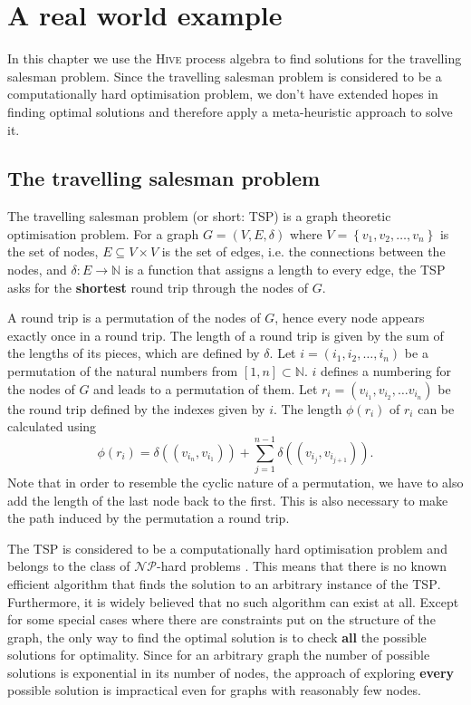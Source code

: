 \chapter{A real world example}
In this chapter we use the \textsc{Hive} process algebra to find solutions for the travelling salesman problem. Since the travelling salesman problem is considered to be a computationally hard optimisation problem, we don't have extended hopes in finding optimal solutions and therefore apply a meta-heuristic approach to solve it.

\section{The travelling salesman problem}
The travelling salesman problem (or short: \textsc{TSP}) is a graph theoretic optimisation problem. For a graph $G = \left( V, E, \delta \right)$ where $V = \left\{ v_1, v_2, \ldots, v_n \right\}$ is the set of nodes, $E \subseteq V \times V$ is the set of edges, i.e. the connections between the nodes, and $\delta \colon E \to \mathbb{N}$ is a function that assigns a length to every edge, the \textsc{TSP} asks for the \textbf{shortest} round trip through the nodes of $G$.

A round trip is a permutation of the nodes of $G$, hence every node appears exactly once in a round trip. The length of a round trip is given by the sum of the lengths of its pieces, which are defined by $\delta$. Let $i = \left( i_1, i_2, \ldots, i_n \right)$ be a permutation of the natural numbers from $[1, n] \subset \mathbb{N}$. $i$ defines a numbering for the nodes of $G$ and leads to a permutation of them. Let $r_i = \left( v_{i_1}, v_{i_2}, \ldots v_{i_n} \right)$ be the round trip defined by the indexes given by $i$. The length $\phi \left( r_i \right)$ of $r_i$ can be calculated using
\begin{equation}
  \label{eqn:length_roundtrip}
  \phi \left( r_i \right) = \delta \left( \left( v_{i_n}, v_{i_1} \right) \right) + \sum_{j=1}^{n-1} \delta \left( \left( v_{i_j}, v_{i_{j+1}} \right) \right).
\end{equation}
Note that in order to resemble the cyclic nature of a permutation, we have to also add the length of the last node back to the first. This is also necessary to make the path induced by the permutation a round trip.

The \textsc{TSP} is considered to be a computationally hard optimisation problem and belongs to the class of $\mathcal{NP}$-hard problems \cite{Garey:1979:CIG:578533}. This means that there is no known efficient algorithm that finds the solution to an arbitrary instance of the \textsc{TSP}. Furthermore, it is widely believed that no such algorithm can exist at all. Except for some special cases where there are constraints put on the structure of the graph, the only way to find the optimal solution is to check \textbf{all} the possible solutions for optimality. Since for an arbitrary graph the number of possible solutions is exponential in its number of nodes, the approach of exploring \textbf{every} possible solution is impractical even for graphs with reasonably few nodes.

